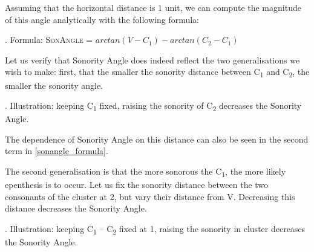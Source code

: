 \documentclass[12pt]{article}
\begin{document}
Assuming that the horizontal distance is 1 unit, we can compute the magnitude of this angle analytically with the following formula:

\ex. \label{sonangle_formula} Formula: \textsc{SonAngle} = $arctan(V-C_1) - arctan(C_2-C_1)$

Let us verify that {\sc Sonority Angle} does indeed reflect the two generalisations we wish to make: first, that the smaller the sonority distance between C\textsubscript{1} and C\textsubscript{2}, the smaller the sonority angle.

\ex. Illustration: keeping C\textsubscript{1} fixed, raising the sonority of C\textsubscript{2} decreases the {\sc Sonority Angle}.

\vspace{-5em}
\begin{center}
\end{center}

The dependence of {\sc Sonority Angle} on this distance can also be seen in the second term in \ref{sonangle_formula}.

The second generalisation is that the more sonorous the C\textsubscript{1}, the more likely
epenthesis is to occur. Let us fix the sonority distance between the two consonants of the cluster at 2, but vary their distance from V. Decreasing this distance decreases the {\sc Sonority Angle}.

\ex. Illustration: keeping C\textsubscript{1} -- C\textsubscript{2} fixed at 1, raising the sonority in cluster decreases the {\sc Sonority Angle}.
\end{document}
